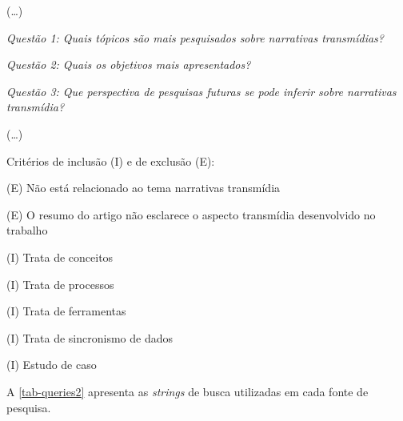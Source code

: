 \documentclass[
article,			%
11pt,				%
oneside,			%
a4paper,			%
english,			%
brazil,				%
sumario=tradicional
]{abntex2}
\begin{document}
  (\ldots)

  \emph{Questão 1: Quais tópicos são mais pesquisados sobre narrativas transmídias?}

  \emph{Questão 2: Quais os objetivos mais apresentados?}

  \emph{Questão 3: Que perspectiva de pesquisas futuras se pode inferir sobre narrativas transmídia?}

  (\ldots)

  Critérios de inclusão (I) e de exclusão (E):

  (E) Não está relacionado ao tema narrativas transmídia

  (E) O resumo do artigo não esclarece o aspecto transmídia desenvolvido no trabalho

  (I) Trata de conceitos

  (I) Trata de processos

  (I) Trata de ferramentas

  (I) Trata de sincronismo de dados

  (I) Estudo de caso

  A \autoref{tab-queries2} apresenta as \textit{strings} de busca utilizadas em cada fonte de pesquisa.
\end{document}
